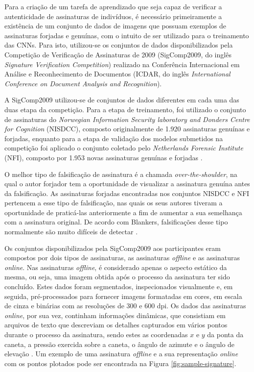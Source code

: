 Para a criação de um tarefa de aprendizado que seja capaz de verificar a autenticidade de assinaturas de indivíduos, é necessário primeiramente a existência de um conjunto de dados de imagens que possuam exemplos de assinaturas forjadas e genuínas, com o intuito de ser utilizado para o treinamento das CNNs. Para isto, utilizou-se os conjuntos de dados disponibilizados pela Competição de Verificação de Assinaturas de 2009 (SigComp2009, do inglês \emph{Signature Verification Competition}) realizado na Conferência Internacional em Análise e Reconhecimento de Documentos (ICDAR, do inglês \emph{International Conference on Document Analysis and Recognition}).

A SigComp2009 utilizou-se de conjuntos de dados diferentes em cada uma das duas etapa da competição. Para a etapa de treinamento, foi utilizado o conjunto de assinaturas do \emph{Norwegian Information Security laboratory and Donders Centre for Cognition} (NISDCC), composto originalmente de 1.920 assinaturas genuínas e forjadas, enquanto para a etapa de validação dos modelos submetidos na competição foi aplicado o conjunto coletado pelo \emph{Netherlands Forensic Institute} (NFI), composto por 1.953 novas assinaturas genuínas e forjadas \cite{icdar2009}.


O melhor tipo de falsificação de assinatura é a chamada \emph{over-the-shoulder}, na qual o autor forjador tem a oportunidade de visualizar a assinatura genuína antes da falsificação. As assinaturas forjadas encontradas nos conjuntos NISDCC e NFI pertencem a esse tipo de falsificação, nas quais os seus autores tiveram a oportunidade de praticá-las anteriormente a fim de aumentar a sua semelhança com a assinatura original. De acordo com Blankers, falsificações desse tipo normalmente são muito difíceis de detectar \cite{icdar2009}.

Os conjuntos disponibilizados pela SigComp2009 aos participantes eram compostos por dois tipos de assinaturas, as assinaturas \emph{offline} e as assinaturas \emph{online}. Nas assinaturas \emph{offline}, é considerado apenas o aspecto estático da mesma, ou seja, uma imagem obtida após o processo da assinatura ter sido concluído. Estes dados foram segmentados, inspecionados visualmente e, em seguida, pré-processados para fornecer imagens formatadas em cores, em escala de cinza e binárias com as resoluções de 300 e 600 dpi. Os dados das assinaturas \emph{online}, por sua vez, continham informações dinâmicas, que consistiam em arquivos de texto que descreviam os detalhes capturados em vários pontos durante o processo da assinatura, sendo estes as coordenadas $x$ e $y$ da ponta da caneta, a pressão exercida sobre a caneta, o ângulo de azimute e o ângulo de elevação \cite{icdar2009}. Um exemplo de uma assinatura \emph{offline} e a sua representação \emph{online} com os pontos plotados pode ser encontrada na Figura \ref{fig:sample-signature}.


